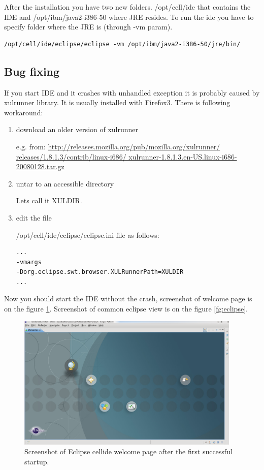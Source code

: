After the installation you have two new folders.
/opt/cell/ide that contains the IDE and /opt/ibm/java2-i386-50 where JRE resides.
To run the ide you have to specify folder where the JRE is (through -vm param).

\begin{verbatim}
/opt/cell/ide/eclipse/eclipse -vm /opt/ibm/java2-i386-50/jre/bin/
\end{verbatim}

\subsection{Bug fixing}
\label{XULLFIX}

If you start IDE and it crashes with unhandled exception it is probably caused by xulrunner library.
It is usually installed with Firefox3. There is following workaround:
\begin{enumerate}
\item download an older version of xulrunner

e.g. from: \url{http://releases.mozilla.org/pub/mozilla.org/xulrunner/ releases/1.8.1.3/contrib/linux-i686/ xulrunner-1.8.1.3.en-US.linux-i686-20080128.tar.gz}

\item untar to an accessible directory

Lets call it XULDIR.

\item edit the file

/opt/cell/ide/eclipse/eclipse.ini file as follows:
\begin{verbatim}
...
-vmargs
-Dorg.eclipse.swt.browser.XULRunnerPath=XULDIR
...
\end{verbatim}
\end{enumerate}
Now you should start the IDE without the crash, screenshot of welcome page is on the figure \ref{fg:eclipseWelcome}.
Screenshot of common eclipse view is on the figure \ref{fg:eclipse}.

\begin{figure}
    \centering
    \includegraphics[width=0.95\textwidth]{data/png/eclipseWelcome}
    \caption[Screenshot cellide after successful startup]{Screenshot of Eclipse cellide welcome page after the first successful startup.}
    \label{fg:eclipseWelcome}
\end{figure}

